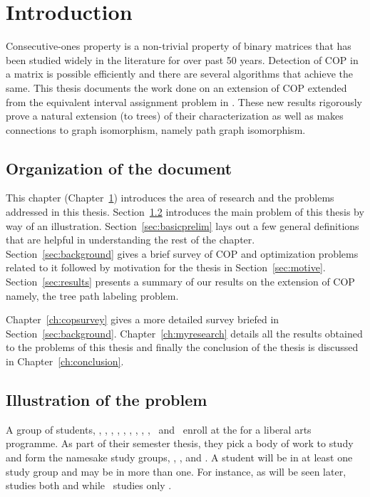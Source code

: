 \chapter{Introduction}
\label{ch:intro}

Consecutive-ones property is a non-trivial property of binary matrices
that has been studied widely in the literature for over past 50
years. Detection of COP in a matrix is possible efficiently and there
are several algorithms that achieve the same. This thesis documents
the work done on an extension of COP extended from the equivalent
interval assignment problem in \cite{nsnrs09}. These new results
rigorously prove a natural extension (to trees) of their
characterization as well as makes connections to graph isomorphism,
namely path graph isomorphism.


\section{Organization of the document}
\label{sec:orgofdoc}
This chapter (Chapter~\ref{ch:intro}) introduces the area of research
and the problems addressed in this thesis.  Section~\ref{sec:problem}
introduces the main problem of this thesis by way of an
illustration. Section~\ref{sec:basicprelim} lays out a few general
definitions that are helpful in understanding the rest of the chapter.
Section~\ref{sec:background} gives a brief survey of COP
and optimization problems related to it followed by motivation for the
thesis in Section~\ref{sec:motive}.  Section~\ref{sec:results}
presents a summary of our results on the extension of COP namely, the
tree path labeling problem.

Chapter~\ref{ch:copsurvey} gives a more detailed survey briefed in
Section~\ref{sec:background}.  Chapter~\ref{ch:myresearch} details all
the results obtained to the problems of this thesis and finally the
conclusion of the thesis is discussed in Chapter~\ref{ch:conclusion}.



\section{Illustration of the problem}
\label{sec:problem}

A group of students, \Pa, \Pig, \Sn, \Wo, \Vi, \Li, \Ch, \Sa, \Fr,
\Sc\ and \Lu\ enroll at the {\WSI} for a liberal arts programme.  As
part of their semester thesis, they pick a body of work to study and
form the namesake study groups, {\LLL}, {\GGG}, {\BBB} and
{\TTT}. A student will be
in at least one study group and may be in more than one. For instance,
as will be seen later, {\Fr} studies both {\LLL} and {\TTT} while \Wo\
studies only \BBB.

